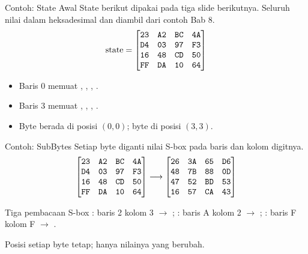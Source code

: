 \documentclass[aspectratio=169,11pt]{beamer}
\begin{document}
\begin{frame}{Contoh: State Awal}
    \footnotesize
    State berikut dipakai pada tiga slide berikutnya. Seluruh nilai dalam
    heksadesimal dan diambil dari contoh Bab 8.
    \vspace{0.15cm}
    \[
        \text{state} =
        \begin{bmatrix}
            \texttt{23} & \texttt{A2} & \texttt{BC} & \texttt{4A} \\
            \texttt{D4} & \texttt{03} & \texttt{97} & \texttt{F3} \\
            \texttt{16} & \texttt{48} & \texttt{CD} & \texttt{50} \\
            \texttt{FF} & \texttt{DA} & \texttt{10} & \texttt{64}
        \end{bmatrix}
    \]
    \vspace{0.1cm}
    \begin{itemize}
        \item Baris 0 memuat , , , .
        \item Baris 3 memuat , , , .
        \item Byte  berada di posisi $(0,0)$; byte  di
              posisi $(3,3)$.
    \end{itemize}
\end{frame}

\begin{frame}{Contoh: SubBytes}
    \footnotesize
    Setiap byte diganti nilai S-box pada baris dan kolom digitnya.
    \vspace{0.1cm}
    \[
        \begin{bmatrix}
            \texttt{23} & \texttt{A2} & \texttt{BC} & \texttt{4A} \\
            \texttt{D4} & \texttt{03} & \texttt{97} & \texttt{F3} \\
            \texttt{16} & \texttt{48} & \texttt{CD} & \texttt{50} \\
            \texttt{FF} & \texttt{DA} & \texttt{10} & \texttt{64}
        \end{bmatrix}
        \longrightarrow
        \begin{bmatrix}
            \texttt{26} & \texttt{3A} & \texttt{65} & \texttt{D6} \\
            \texttt{48} & \texttt{7B} & \texttt{88} & \texttt{0D} \\
            \texttt{47} & \texttt{52} & \texttt{BD} & \texttt{53} \\
            \texttt{16} & \texttt{57} & \texttt{CA} & \texttt{43}
        \end{bmatrix}
    \]
    \vspace{0.05cm}
    \begin{exampleblock}{Tiga pembacaan S-box}
        \scriptsize
        : baris 2 kolom 3 $\to$ ;\quad
        : baris A kolom 2 $\to$ ;\quad
        : baris F kolom F $\to$ .
    \end{exampleblock}
    \vspace{0.02cm}
    Posisi setiap byte tetap; hanya nilainya yang berubah.
\end{frame}
\end{document}
